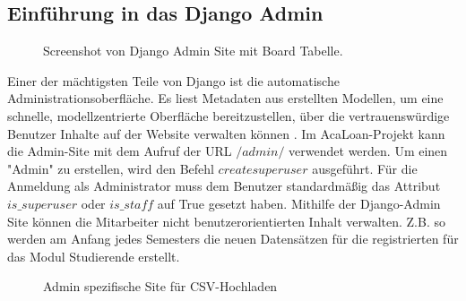 \subsection{Einführung in das Django Admin}
\label{sec:server:admin}
\begin{figure}
	\centering
	\caption{Screenshot von Django Admin Site mit Board Tabelle.}
	\label{fig:django_admin}
\end{figure}
Einer der mächtigsten Teile von Django ist die automatische Administrationsoberfläche. Es liest Metadaten aus erstellten Modellen, um eine schnelle, modellzentrierte Oberfläche bereitzustellen, über die vertrauenswürdige Benutzer Inhalte auf der Website verwalten können \cite{website:djangoAdmin}. Im AcaLoan-Projekt kann die Admin-Site mit dem Aufruf der URL $/admin/$ verwendet werden. Um einen "Admin" zu erstellen, wird den Befehl $createsuperuser$ ausgeführt. Für die Anmeldung als Administrator muss dem Benutzer standardmäßig das Attribut $is\_superuser$ oder $is\_staff$ auf True gesetzt haben. Mithilfe der Django-Admin Site können die Mitarbeiter nicht benutzerorientierten Inhalt verwalten. Z.B. so werden am Anfang jedes Semesters die neuen Datensätzen für die registrierten für das Modul Studierende erstellt. 
\begin{figure}
	\caption{Admin spezifische Site für CSV-Hochladen}
	\label{fig:upload_csv}
\end{figure}
